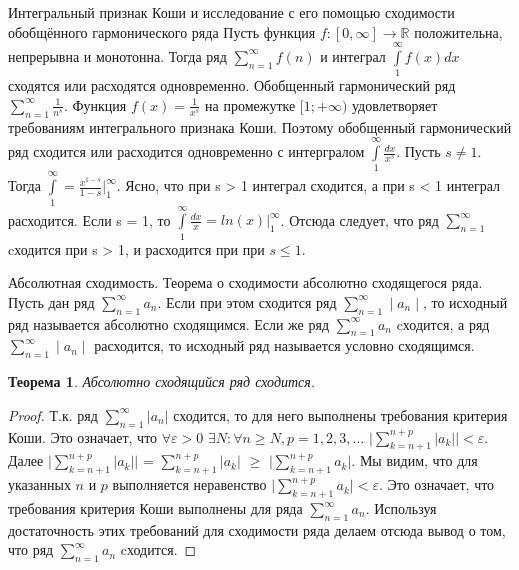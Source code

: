 \documentclass[12pt, a4paper]{article}
\newtheorem{thm}{Теорема}
\newenvironment{field}{}{\newpage}
\newif\ifnote
\newenvironment{note}{\notetrue}{\notefalse}
\begin{document}
\begin{note}
\begin{field}
Интегральный признак Коши и исследование с его помощью сходимости обобщённого гармонического ряда
\end{field}
\begin{field}
Пусть функция $f : [0, \infty] \to \mathbb{R}$ положительна, непрерывна и монотонна. Тогда ряд $\sum\limits_{n=1}^{\infty}f(n)$ и интеграл $\int\limits_1^\infty f(x) dx$ сходятся или расходятся одновременно.
\newline
Обобщенный гармонический ряд $\sum\limits_{n=1}^{\infty}\frac{1}{n^s}$. Функция $f(x) = \frac{1}{x^s}$ на промежутке $[1; +\infty)$ удовлетворяет требованиям интегрального признака Коши. Поэтому обобщенный гармонический ряд сходится или расходится одновременно с интергралом $\int\limits_{1}^{\infty}\frac{dx}{x^s}$. Пусть $s \neq 1$. Тогда $\int\limits_{1}^{\infty} = \frac{x^{1 - s}}{1- s}\bigg|_1^{\infty}$. Ясно, что при s > 1 интеграл сходится, а при s < 1 интеграл расходится. Если s = 1, то $\int\limits_{1}^{\infty}\frac{dx}{x} = ln(x)\bigg|_1^{\infty}$. Отсюда следует, что ряд $\sum\limits_{n=1}^{\infty}$ cходится при s > 1, и расходится при при $s \leq 1$.



\end{field}
\end{note}

\begin{note}
\begin{field}
Абсолютная сходимость. Теорема о сходимости абсолютно сходящегося ряда.
\end{field}
\begin{field}
Пусть дан ряд  $\sum\limits_{n=1}^{\infty}a_n$. Если при этом сходится ряд $\sum\limits_{n=1}^{\infty}\mid a_n \mid$, то исходный ряд называется абсолютно сходящимся. Если же ряд $\sum\limits_{n=1}^{\infty}a_n$ cходится, а ряд  $\sum\limits_{n=1}^{\infty}\mid a_n \mid$ расходится, то исходный ряд называется условно сходящимся.
\begin{thm}
	Абсолютно сходящийся ряд сходится.
\end{thm}
\begin{proof}
	Т.к. ряд $\sum\limits_{n=1}^{\infty}|a_n|$ сходится, то для него выполнены требования критерия Коши. Это означает, что $\forall \varepsilon > 0$ $\exists N : \forall n \geq N, p = 1, 2, 3, ...$  $\bigg| \sum\limits_{k=n+1}^{n + p}|a_k| \bigg| < \varepsilon$. Далее $\bigg| \sum\limits_{k=n+1}^{n + p}|a_k| \bigg|$ = $\sum\limits_{k=n+1}^{n + p}|a_k| $ $ \geq $ $ \bigg| \sum\limits_{k=n+1}^{n + p}a_k \bigg| $. Мы видим, что для указанных $n$ и $p$ выполняется неравенство $\bigg| \sum\limits_{k=n+1}^{n + p}a_k \bigg| < \varepsilon$. Это означает, что требования критерия Коши выполнены для ряда $\sum\limits_{n=1}^{\infty}a_n$. Используя достаточность этих требований для сходимости ряда делаем отсюда вывод о том, что ряд $\sum\limits_{n=1}^{\infty}a_n$ cходится.
\end{proof}
\end{field}
\end{note}
\end{document}
